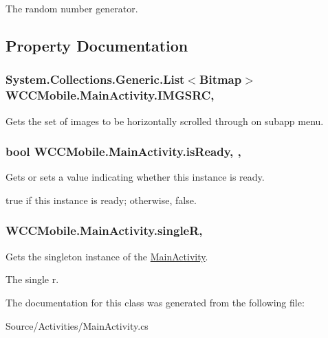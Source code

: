 The random number generator. 



\subsection{Property Documentation}
\subsubsection[{\texorpdfstring{I\+M\+G\+S\+RC}{IMGSRC}}]{\setlength{\rightskip}{0pt plus 5cm}System.\+Collections.\+Generic.\+List$<$Bitmap$>$ W\+C\+C\+Mobile.\+Main\+Activity.\+I\+M\+G\+S\+RC\hspace{0.3cm}{\ttfamily [static]}, {\ttfamily [get]}}\hypertarget{class_w_c_c_mobile_1_1_main_activity_a51b91f0a986746cdd5609722deca9330}{}\label{class_w_c_c_mobile_1_1_main_activity_a51b91f0a986746cdd5609722deca9330}


Gets the set of images to be horizontally scrolled through on subapp menu. 

\subsubsection[{\texorpdfstring{is\+Ready}{isReady}}]{\setlength{\rightskip}{0pt plus 5cm}bool W\+C\+C\+Mobile.\+Main\+Activity.\+is\+Ready\hspace{0.3cm}{\ttfamily [static]}, {\ttfamily [get]}, {\ttfamily [set]}}\hypertarget{class_w_c_c_mobile_1_1_main_activity_a392159539f2848512f11189310be9280}{}\label{class_w_c_c_mobile_1_1_main_activity_a392159539f2848512f11189310be9280}


Gets or sets a value indicating whether this instance is ready. 

{\ttfamily true} if this instance is ready; otherwise, {\ttfamily false}. 
\subsubsection[{\texorpdfstring{singleR}{singleR}}]{ W\+C\+C\+Mobile.\+Main\+Activity.\+singleR\hspace{0.3cm}{\ttfamily [static]}, {\ttfamily [get]}}\hypertarget{class_w_c_c_mobile_1_1_main_activity_aabc36edadb3768e48df7834bc7204f8e}{}\label{class_w_c_c_mobile_1_1_main_activity_aabc36edadb3768e48df7834bc7204f8e}


Gets the singleton instance of the \hyperlink{class_w_c_c_mobile_1_1_main_activity}{Main\+Activity}. 

The single r. 

The documentation for this class was generated from the following file\+:\begin{DoxyCompactItemize}
\item 
Source/\+Activities/Main\+Activity.\+cs\end{DoxyCompactItemize}
